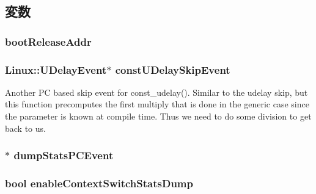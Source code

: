 \subsection{変数}
\hypertarget{classLinuxArmSystem_ab9398c8331a3a3619bf16596eb81c1dc}{
\subsubsection[{bootReleaseAddr}]{ {\bf bootReleaseAddr}}}
\label{classLinuxArmSystem_ab9398c8331a3a3619bf16596eb81c1dc}
\hypertarget{classLinuxArmSystem_a4f8baa07addc116cd3bbca7ced7ed334}{
\subsubsection[{constUDelaySkipEvent}]{\setlength{\rightskip}{0pt plus 5cm}Linux::UDelayEvent$\ast$ {\bf constUDelaySkipEvent}}}
\label{classLinuxArmSystem_a4f8baa07addc116cd3bbca7ced7ed334}
Another PC based skip event for const\_\-udelay(). Similar to the udelay skip, but this function precomputes the first multiply that is done in the generic case since the parameter is known at compile time. Thus we need to do some division to get back to us. \hypertarget{classLinuxArmSystem_a20f10ec8abaa110783e089fa10fc4da3}{
\subsubsection[{dumpStatsPCEvent}]{$\ast$ {\bf dumpStatsPCEvent}}}
\label{classLinuxArmSystem_a20f10ec8abaa110783e089fa10fc4da3}
\hypertarget{classLinuxArmSystem_a4f36b860c5380f4fc20e37e283fd8a1b}{
\subsubsection[{enableContextSwitchStatsDump}]{\setlength{\rightskip}{0pt plus 5cm}bool {\bf enableContextSwitchStatsDump}}}
